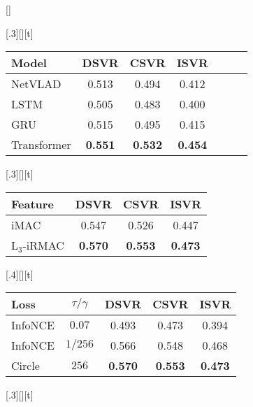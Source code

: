 \documentclass[10pt,twocolumn,letterpaper]{article}
\begin{document}
\begin{table*}[t]
[\textwidth]{\begin{subfloatrow}
[.3\textwidth][\FBheight][t]{\caption{\textbf{Model} (mAP on FIVR-5K)} \label{subtab:model}}{
    \centering
    \setlength{\tabcolsep}{4pt}
    \begin{tabular}{lcccccc}
Model & DSVR  & CSVR  & ISVR \\ 
\toprule
    NetVLAD     & 0.513 & 0.494 & 0.412 \\
    LSTM        & 0.505 & 0.483 & 0.400 \\
    GRU         & 0.515 & 0.495 & 0.415 \\
    Transformer & \textbf{0.551} & \textbf{0.532} & \textbf{0.454} \\
\end{tabular}
}
[.3\textwidth][\FBheight][t]{\caption{\textbf{Feature} (mAP on FIVR-200K)} \label{subtab:feature}}{
    \centering
    \setlength{\tabcolsep}{4pt}
    \begin{tabular}{lccc}
    Feature & DSVR  & CSVR  & ISVR  \\
    \toprule
    iMAC    & 0.547 & 0.526 & 0.447 \\
    $\text{L}_3$-iRMAC  & \textbf{0.570} & \textbf{0.553} & \textbf{0.473} \\
    \end{tabular}
}
[.4\textwidth][\FBheight][t]{\caption{\textbf{Loss function} (mAP on FIVR-200K)} \label{subtab:loss}}{
    \centering
    \setlength{\tabcolsep}{2pt}
    \begin{tabular}{lcccc}
    Loss & $\tau/\gamma$ & DSVR  & CSVR  & ISVR  \\
    \toprule
    InfoNCE & $0.07$   & 0.493          & 0.473          & 0.394          \\
    InfoNCE & $1/256$  & 0.566          & 0.548          & 0.468          \\
    Circle  & $256$    & \textbf{0.570} & \textbf{0.553} & \textbf{0.473} \\
    \end{tabular}
}
\end{subfloatrow}
\par\nointerlineskip\vspace{8pt}
\begin{subfloatrow}
[.3\textwidth][\FBheight][t]{\caption{\textbf{Bank size} (mAP on FIVR-5K)} \label{subtab:banksz}}{
    \centering
    \setlength{\tabcolsep}{2pt}
    \begin{tabular}{lcccc}

\end{tabular}}
\end{subfloatrow}}
\end{table*}
\end{document}

